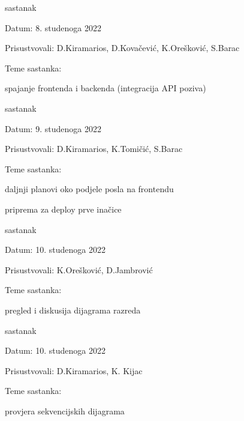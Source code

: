 \begin{packed_enum}
			\item  sastanak
			\item[] \begin{packed_item}
				\item Datum: 8. studenoga 2022
				\item Prisustvovali: D.Kiramarios, D.Kovačević, K.Orešković, S.Barac
				\item Teme sastanka:
				\begin{packed_item}
					\item spajanje frontenda i backenda (integracija API poziva)
				\end{packed_item}
			\end{packed_item}

			\item  sastanak
			\item[] \begin{packed_item}
				\item Datum: 9. studenoga 2022
				\item Prisustvovali: D.Kiramarios, K.Tomičić, S.Barac
				\item Teme sastanka:
				\begin{packed_item}
					\item daljnji planovi oko podjele posla na frontendu
					\item priprema za deploy prve inačice
				\end{packed_item}
			\end{packed_item}

			\item  sastanak
			\item[] \begin{packed_item}
				\item Datum: 10. studenoga 2022
				\item Prisustvovali: K.Orešković, D.Jambrović
				\item Teme sastanka:
				\begin{packed_item}
					\item pregled i diskusija dijagrama razreda
				\end{packed_item}
			\end{packed_item}

			\item  sastanak
			\item[] \begin{packed_item}
				\item Datum: 10. studenoga 2022
				\item Prisustvovali: D.Kiramarios, K. Kijac
				\item Teme sastanka:
				\begin{packed_item}
					\item provjera sekvencijskih dijagrama
				\end{packed_item}
			\end{packed_item}


\end{packed_enum}

